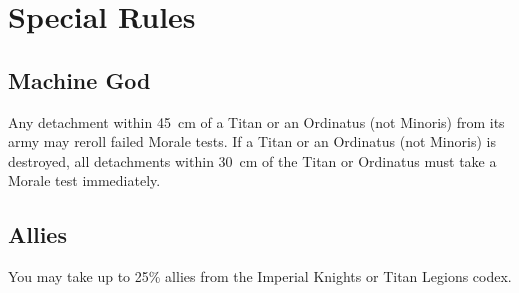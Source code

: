 \section{Special Rules}

\subsection{Machine God}

Any detachment within 45~cm of a Titan or an Ordinatus (not Minoris) from its army may reroll failed Morale tests. If a Titan or an Ordinatus (not Minoris) is destroyed, all detachments within 30~cm of the Titan or Ordinatus must take a Morale test immediately.

\subsection{Allies}

You may take up to 25\% allies from the Imperial Knights or Titan Legions codex.
